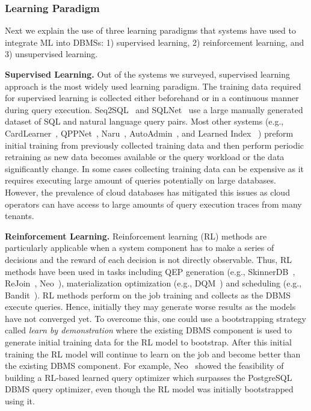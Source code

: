 \subsubsection{Learning Paradigm}
Next we explain the use of three learning paradigms that systems have used to integrate ML into DBMSs: 1) supervised learning, 2) reinforcement learning, and 3) unsupervised learning.

\vspace{2mm}
\noindent \textbf{Supervised Learning.} Out of the systems we surveyed, supervised learning approach is the most widely used learning paradigm.
The training data required for supervised learning is collected either beforehand or in a continuous manner during query execution.
Seq2SQL~\cite{seq2sql} and SQLNet~\cite{sqlnet} use a large manually generated dataset of SQL and natural language query pairs.
Most other systems (e.g., CardLearner~\cite{cardlearner}, QPPNet~\cite{qppnet}, Naru~\cite{naru}, AutoAdmin~\cite{autoadmin, autoadmin_2}, and Learned Index ~\cite{learnedindex}) preform initial training from previously collected training data and then perform periodic retraining as new data becomes available or the query workload or the data significantly change.
In some cases collecting training data can be expensive as it requires executing large amount of queries potentially on large databases.
However, the prevalence of cloud databases has mitigated this issues as cloud operators can have access to large amounts of query execution traces from many tenants.

\vspace{2mm}
\noindent \textbf{Reinforcement Learning.} Reinforcement learning (RL) methods are particularly applicable when a system component has to make a series of decisions and the reward of each decision is not directly observable.
Thus, RL methods have been used in tasks including QEP generation (e.g., SkinnerDB~\cite{skinnerdb}, ReJoin~\cite{rejoin}, Neo~\cite{neo}), materialization optimization (e.g., DQM~\cite{dqm}) and scheduling (e.g., Bandit~\cite{bandit}).
RL methods perform on the job training and collects as the DBMS execute queries.
Hence, initially they may generate worse results as the models have not converged yet.
To overcome this, one could use a bootstrapping strategy called  \textit{learn by demonstration} where the existing DBMS component is used to generate initial training data for the RL model to bootstrap.
After this initial training the RL model will continue to learn on the job and become better than the existing DBMS component.
For example, Neo~\cite{neo} showed the feasibility of building a RL-based learned query optimizer which surpasses the PostgreSQL DBMS query optimizer, even though the RL model was initially bootstrapped using it.


